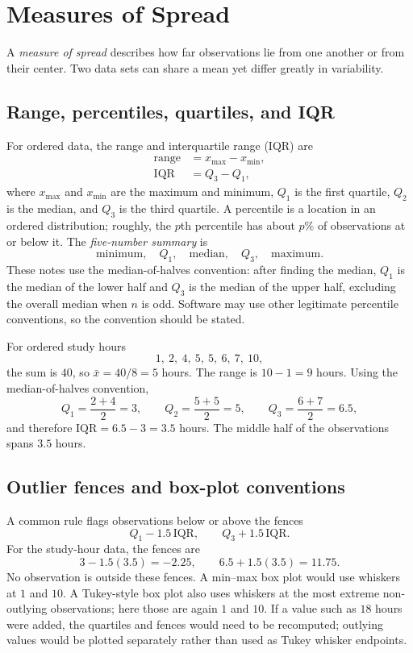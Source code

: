 \documentclass[11pt]{article}
\begin{document}
\section{Measures of Spread}\label{sec:spread}
A \emph{measure of spread} describes how far observations lie from one
another or from their center.  Two data sets can share a mean yet differ
greatly in variability.

\subsection{Range, percentiles, quartiles, and IQR}
For ordered data, the range and interquartile range (IQR) are
\begin{align}
 \text{range}&=x_{\max}-x_{\min},\label{eq:range}\\
 \mathrm{IQR}&=Q_3-Q_1,\label{eq:iqr}
\end{align}
where $x_{\max}$ and $x_{\min}$ are the maximum and minimum, $Q_1$ is the
first quartile, $Q_2$ is the median, and $Q_3$ is the third quartile.  A
percentile is a location in an ordered distribution; roughly, the $p$th
percentile has about $p\%$ of observations at or below it.  The
\emph{five-number summary} is
\[
\text{minimum},\quad Q_1,\quad \text{median},\quad Q_3,\quad \text{maximum}.
\]
These notes use the median-of-halves convention: after finding the median,
$Q_1$ is the median of the lower half and $Q_3$ is the median of the upper
half, excluding the overall median when $n$ is odd.  Software may use other
legitimate percentile conventions, so the convention should be stated.

For ordered study hours
\[
1,\ 2,\ 4,\ 5,\ 5,\ 6,\ 7,\ 10,
\]
the sum is $40$, so $\bar{x}=40/8=5$ hours.  The range is $10-1=9$ hours.
Using the median-of-halves convention,
\[
 Q_1=\frac{2+4}{2}=3,\qquad
 Q_2=\frac{5+5}{2}=5,\qquad
 Q_3=\frac{6+7}{2}=6.5,
\]
and therefore $\mathrm{IQR}=6.5-3=3.5$ hours.  The middle half of the
observations spans $3.5$ hours.

\subsection{Outlier fences and box-plot conventions}
A common rule flags observations below or above the fences
\begin{equation}\label{eq:iqr-fences}
Q_1-1.5\,\mathrm{IQR},\qquad Q_3+1.5\,\mathrm{IQR}.
\end{equation}
For the study-hour data, the fences are
\[
3-1.5(3.5)=-2.25,\qquad 6.5+1.5(3.5)=11.75.
\]
No observation is outside these fences.  A min--max box plot would use
whiskers at $1$ and $10$.  A Tukey-style box plot also uses whiskers at the
most extreme non-outlying observations; here those are again $1$ and $10$.
If a value such as $18$ hours were added, the quartiles and fences would need
to be recomputed; outlying values would be plotted separately rather than
used as Tukey whisker endpoints.
\end{document}
